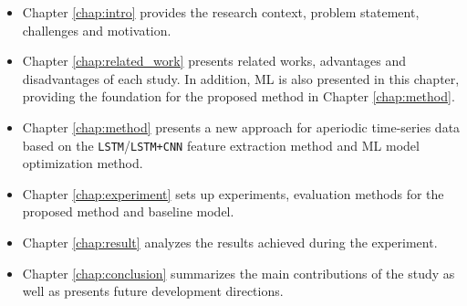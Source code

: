 \begin{itemize}
    \item Chapter \ref{chap:intro} provides the research context, problem statement, challenges and motivation.
    \item Chapter \ref{chap:related_work} presents related works, advantages and disadvantages of each study. In addition, ML is also presented in this chapter, providing the foundation for the proposed method in Chapter \ref{chap:method}.
    \item Chapter \ref{chap:method} presents a new approach for aperiodic time-series data based on the \verb|LSTM|/\verb|LSTM+CNN| feature extraction method and ML model optimization method.
    \item Chapter \ref{chap:experiment} sets up experiments, evaluation methods for the proposed method and baseline model.
    \item Chapter \ref{chap:result} analyzes the results achieved during the experiment.
    \item Chapter \ref{chap:conclusion} summarizes the main contributions of the study as well as presents future development directions.
\end{itemize}
